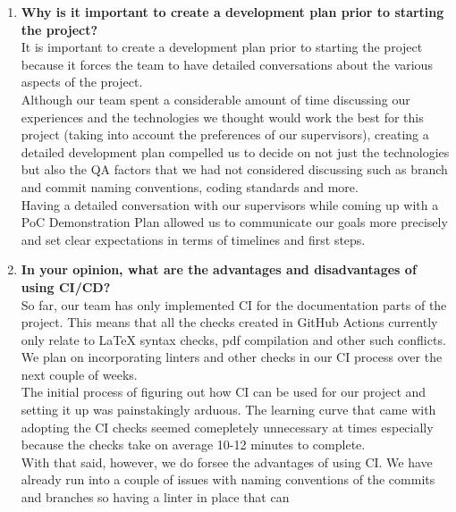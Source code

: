 \documentclass{article}
\begin{document}
\begin{enumerate}
    \item \textbf{Why is it important to create a development plan prior to starting the
    project?}\\
    \newline
    It is important to create a development plan prior to starting the project because
    it forces the team to have detailed conversations about the various aspects of the project.\\
    \newline
    Although our team spent a considerable amount of time discussing our experiences and the
    technologies we thought would work the best for this project (taking into account the preferences
    of our supervisors), creating a detailed development plan compelled us to decide on not just the 
    technologies but also the QA factors that we had not considered discussing such as branch and commit 
    naming conventions, coding standards and more.\\
    \newline
    Having a detailed conversation with our supervisors while coming up with a PoC Demonstration
    Plan allowed us to communicate our goals more precisely and set clear expectations in terms of timelines
    and first steps.
    \item \textbf{In your opinion, what are the advantages and disadvantages of using
    CI/CD?}\\
    \newline
    So far, our team has only implemented CI for the documentation parts of the project. This means that
    all the checks created in GitHub Actions currently only relate to LaTeX syntax checks, pdf compilation
    and other such conflicts. We plan on incorporating linters and other checks in our CI process over the
    next couple of weeks.\\
    \newline
    The initial process of figuring out how CI can be used for our project and setting it up was painstakingly
    arduous. The learning curve that came with adopting the CI checks seemed comepletely unnecessary at times
    especially because the checks take on average 10-12 minutes to complete.\\
    \newline
    With that said, however, we do forsee the advantages of using CI. We have already run into a
    couple of issues with naming conventions of the commits and branches so having a linter in place that can

\end{enumerate}
\end{document}

